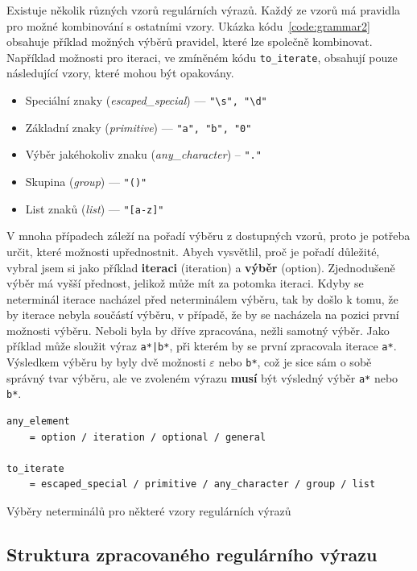 Existuje několik různých vzorů regulárních výrazů.
Každý ze vzorů má pravidla pro možné kombinování s ostatními vzory.
Ukázka kódu~\ref{code:grammar2} obsahuje příklad možných výběrů pravidel, které lze společně kombinovat.
Například možnosti pro iteraci, ve zmíněném kódu \texttt{to\_iterate}, obsahují pouze následující vzory, které mohou být opakovány.

\begin{itemize}
	\item Speciální znaky (\textit{escaped\_special}) --- \texttt{"\textbackslash s", "\textbackslash d"}
	\item Základní znaky (\textit{primitive}) --- \texttt{"a", "b", "0"}
	\item Výběr jakéhokoliv znaku (\textit{any\_character}) -- \texttt{"."}
	\item Skupina (\textit{group}) --- \texttt{"()"}
	\item List znaků (\textit{list}) --- \texttt{"[a-z]"}
\end{itemize}

V mnoha případech záleží na pořadí výběru z dostupných vzorů, proto je potřeba určit, které možnosti upřednostnit.
Abych vysvětlil, proč je pořadí důležité, vybral jsem si jako příklad \textbf{iteraci} (iteration) a \textbf{výběr} (option).
Zjednodušeně výběr má vyšší přednost, jelikož může mít za potomka iteraci.
Kdyby se neterminál iterace nacházel před neterminálem výběru, tak by došlo k tomu, že by iterace nebyla součástí výběru, v případě, že by se nacházela na pozici první možnosti výběru. 
Neboli byla by dříve zpracována, nežli samotný výběr.
Jako příklad může sloužit výraz \texttt{a*|b*}, při kterém by se první zpracovala iterace \texttt{a*}.
Výsledkem výběru by byly dvě možnosti $\varepsilon$ nebo \texttt{b*}, což je sice sám o sobě správný tvar výběru, ale ve zvoleném výrazu \textbf{musí} být výsledný výběr \texttt{a*} nebo \texttt{b*}.

\begin{code}[!ht]
	\begin{verbatim}
any_element 
	= option / iteration / optional / general

to_iterate
	= escaped_special / primitive / any_character / group / list
	\end{verbatim}
	\caption{Výběry neterminálů pro některé vzory regulárních výrazů}
	\label{code:grammar2}
\end{code}

\subsection*{Struktura zpracovaného regulárního výrazu}


